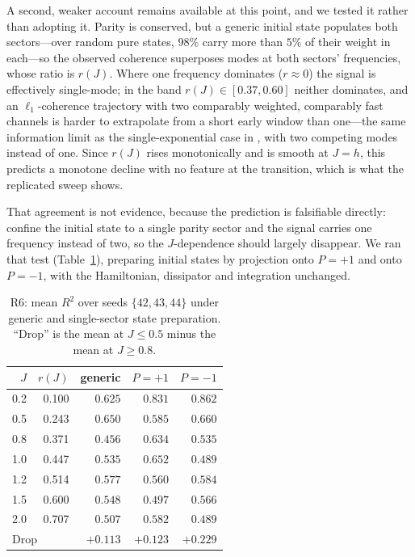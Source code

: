 \documentclass[twocolumn,10pt]{article}
\begin{document}
A second, weaker account remains available at this point, and we tested it
rather than adopting it.
Parity is conserved, but a generic initial state populates both
sectors---over random pure states, $98\%$ carry more than $5\%$ of
their weight in each---so the observed coherence superposes modes at
both sectors' frequencies, whose ratio is $r(J)$.
Where one frequency dominates ($r\approx0$) the signal is effectively
single-mode; in the band $r(J)\in[0.37,0.60]$ neither dominates, and an
$\ell_1$-coherence trajectory with two comparably weighted, comparably
fast channels is harder to extrapolate from a short early window than
one---the same information limit as the single-exponential case in
\cite{Paper1Brusnikin}, with two competing modes instead of one.
Since $r(J)$ rises monotonically and is smooth at $J=h$, this predicts a
monotone decline with no feature at the transition, which is what the
replicated sweep shows.

That agreement is not evidence, because the prediction is falsifiable
directly: confine the initial state to a single parity sector and the
signal carries one frequency instead of two, so the $J$-dependence
should largely disappear.
We ran that test (Table~\ref{tab:r6}), preparing initial states by
projection onto $P=+1$ and onto $P=-1$, with the Hamiltonian,
dissipator and integration unchanged.

\begin{table}[h]
\centering
\caption{R6: mean $R^2$ over seeds $\{42,43,44\}$ under generic and
  single-sector state preparation. ``Drop'' is the mean at $J\leq0.5$
  minus the mean at $J\geq0.8$.\label{tab:r6}}
\footnotesize
\setlength{\tabcolsep}{4pt}
\begin{tabular}{rrrrr}
\toprule
$J$ & $r(J)$ & generic & $P={+}1$ & $P={-}1$ \\
\midrule
0.2 & 0.100 & $0.625$ & $0.831$ & $0.862$ \\
0.5 & 0.243 & $0.650$ & $0.585$ & $0.660$ \\
0.8 & 0.371 & $0.456$ & $0.634$ & $0.535$ \\
1.0 & 0.447 & $0.535$ & $0.652$ & $0.489$ \\
1.2 & 0.514 & $0.577$ & $0.560$ & $0.584$ \\
1.5 & 0.600 & $0.548$ & $0.497$ & $0.566$ \\
2.0 & 0.707 & $0.507$ & $0.582$ & $0.489$ \\
\midrule
\multicolumn{2}{l}{Drop} & $+0.113$ & $+0.123$ & $+0.229$ \\
\bottomrule
\end{tabular}
\end{table}
\end{document}
